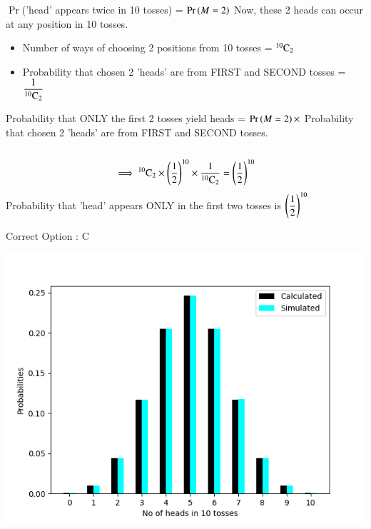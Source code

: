 \documentclass[journal,12pt,twocolumn]{IEEEtran}
\begin{document}
$\Pr$('head' appears twice in 10 tosses) = $\Pr\left(M = 2\right)$
Now, these 2 heads can occur at any position in 10 tosses.
\begin{itemize}
    \item Number of ways of choosing 2 positions from 10 tosses = ${}^{10}\mathrm{C}_{2}$
          \bigskip
    \item Probability that chosen 2 'heads' are from FIRST and SECOND tosses = \(\displaystyle \frac{1}{{}^{10}\mathrm{C}_{2}}\)
          \bigskip
\end{itemize}
Probability that ONLY the first 2 tosses yield heads =  $\Pr\left(M = 2\right) \times$ Probability that chosen 2 'heads' are from FIRST and SECOND tosses.\\\\
\begin{align}
    \implies {}^{10}\mathrm{C}_{2} \times \left(\frac{1}{2}\right)^{10} \times \frac{1}{{}^{10}\mathrm{C}_{2}} = \left(\frac{1}{2}\right)^{10}\notag
\end{align}
Probability that 'head' appears ONLY in the first two tosses is $\displaystyle\left(\frac{1}{2}\right)^{10}$\\
\begin{center}
    Correct Option : C
\end{center}
\pagebreak
\includegraphics{Figure-1.png}
\end{document}
